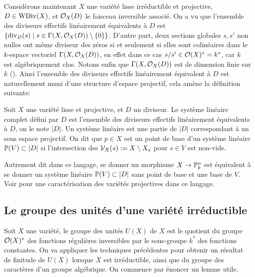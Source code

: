 Considèrons maintenant $X$ une variété lisse irréductible et projective, $D\in \operatorname{WDiv}(X)$, et $\mathcal{O}_X(D)$ le faisceau inversible associé. On a vu que l'ensemble des diviseurs effectifs linéairement équivalents à $D$ est $\lbrace \operatorname{div}_D(s)\mid s\in\Gamma(X,\mathcal{O}_X(D))\setminus\lbrace0\rbrace \rbrace$. D'autre part, deux sections globales $s, s'$ non nulles ont même diviseur des zéros si et seulement si elles sont colinéaires dans le $k$-espace vectoriel $\Gamma(X, \mathcal{O}_X(D))$, en effet dans ce cas $s/s'\in \mathcal{O}(X)^*=k^*$, car $k$ est algébriquement clos. Notons enfin que $\Gamma(X, \mathcal{O}_X(D))$ est de dimension finie sur $k$ (\cite[II.5.19]{Hartshorne}). Ainsi l'ensemble des diviseurs effectifs linéairement équivalent à $D$ est naturellement muni d'une structure d'espace projectif, cela amène la définition suivante:
\begin{defn}
Soit $X$ une variété lisse et projective, et $D$ un diviseur. Le système linéaire complet défini par $D$ est l'ensemble des diviseurs effectifs linéairement équivalents à $D$, on le note $|D|$. Un système linéaire est une partie de $|D|$ correspondant à un sous espace projectif. On dit que $p\in X$ est un point de base d'un système linéaire $\mathbb{P}(V)\subset |D|$ si l'intersection des $\mathcal{V}_X(s):=X\setminus X_s$ pour $s\in V$ est non-vide. 
\end{defn}

Autrement dit dans ce langage, se donner un morphisme $X\rightarrow \mathbb{P}^n_k$ est équivalent à se donner un système linéaire $\mathbb{P}(V)\subset |D|$ sans point de base et une base de $V$. Voir \cite[II.7.8.2]{Hartshorne} pour une caractérisation des variétés projectives dans ce langage.


\subsection{Le groupe des unités d'une variété irréductible}
\label{unitGroupFiniteType}


Soit $X$ une variété, le groupe des unités $U(X)$ de $X$ est le quotient du groupe $\mathcal{O}(X)^*$ des fonctions régulières inversibles par le sous-groupe $k^*$ des fonctions constantes. On va appliquer les techniques précédentes pour obtenir un résultat de finitude de $U(X)$ lorsque $X$ est irréductible, ainsi que du groupe des caractères d'un groupe algébrique. On commence par énoncer un lemme utile.

